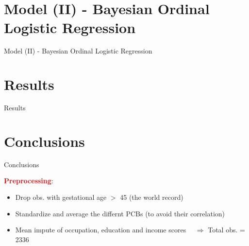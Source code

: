 \documentclass{beamer}
\begin{document}
\section{Model (II) - Bayesian Ordinal Logistic Regression}
\begin{frame}{Model (II) - Bayesian Ordinal Logistic Regression}
\end{frame}
\section{Results}
\begin{frame}{Results}
\end{frame}
\section{Conclusions}
\begin{frame}{Conclusions}
\end{frame}
\begin{frame}
\textcolor{red}{\textbf{Preprocessing}}:
{\small
\begin{itemize}
\item Drop obs. with gestational age $>$ 45 (the world record)
\item Standardize and average the differnt PCBs (to avoid their correlation)
\item Mean impute of occupation, education and income scores 
$\quad \Longrightarrow$ Total obs. = 2336
\end{itemize}}
\end{frame}
\end{document}
